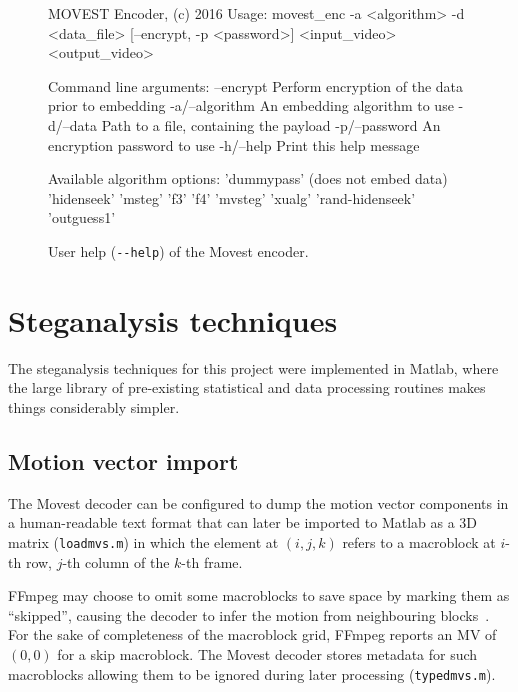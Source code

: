 \documentclass[12pt,british,twoside,notitlepage,usenames,dvipsnames,hypens,final]{report}
\numberwithin{equation}{section}
\numberwithin{figure}{section}
\renewenvironment{alltt}{\vspace{-0.6\baselineskip}\begin{oldalltt}}{\end{oldalltt}\vspace{-0.1\baselineskip}}
\begin{document}
\begin{figure}[tbh]
\vspace{1em}
\centering
\begin{minipage}{0.9\textwidth}
\begingroup
    \fontsize{10pt}{12pt}\selectfont
\begin{alltt}
MOVEST Encoder, (c) 2016
Usage: movest_enc -a <algorithm> -d <data_file> [--encrypt, -p <password>]
<input_video> <output_video>

Command line arguments:
 --encrypt        Perform encryption of the data prior to embedding
 -a/--algorithm   An embedding algorithm to use
 -d/--data        Path to a file, containing the payload
 -p/--password    An encryption password to use
 -h/--help        Print this help message

Available algorithm options:
 'dummypass' (does not embed data)
 'hidenseek' 'msteg' 'f3' 'f4'
 'mvsteg' 'xualg'
 'rand-hidenseek' 'outguess1'
\end{alltt}
\endgroup
\end{minipage}
\caption{User help (\texttt{-{}-help}) of the Movest encoder.}
\label{fig:encoder-help}
\end{figure}

\section{Steganalysis techniques}
\label{steg-tech}

The steganalysis techniques for this project were implemented in Matlab, where the large library of pre-existing statistical and data processing routines makes things considerably simpler.

\subsection{Motion vector import}
\label{mv-import}

The Movest decoder can be configured to dump the motion vector components in a human-readable text format that can later be imported to Matlab as a 3D matrix (\texttt{loadmvs.m}) in which the element at $(i, j, k)$ refers to a macroblock at $i$-th row, $j$-th column of the $k$-th frame. 

FFmpeg may choose to omit some macroblocks to save space by marking them as ``skipped'', causing the decoder to infer the motion from neighbouring blocks~\cite{tourapis2004direct}. For the sake of completeness of the macroblock grid, FFmpeg reports an MV of $(0, 0)$ for a skip macroblock. The Movest decoder stores metadata for such macroblocks allowing them to be ignored during later processing (\texttt{typedmvs.m}).
\end{document}
